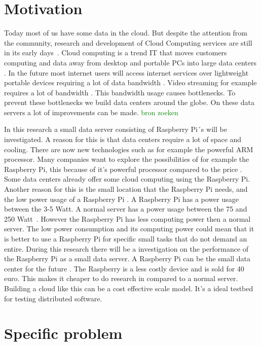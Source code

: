 \documentclass{sig-alternate-br}
\newcommand\todo[1]{
	\textcolor{green}{#1}
	}
\begin{document}
\section{Motivation}
Today most of us have some data in the cloud. But despite the attention from the community, research and development of Cloud Computing services are still in its early days~\cite{tso:2013}. \newline
Cloud computing is a trend IT that moves customers  computing and data away from desktop and portable PCs into large data centers \cite{dikaiakos:2009}. In the future most internet users will access internet services over lightweight portable devices requiring a lot of data bandwidth \cite{dikaiakos:2009}. Video streaming for example requires a lot of bandwidth \cite{Adhikari:2012}. This bandwidth usage causes bottlenecks. To prevent these bottlenecks we build data centers around the globe. On these data servers a lot of improvements can be made. \todo{bron zoeken}
 \newline
In this research a small data server consisting of Raspberry Pi´s will be investigated. A reason for this is that data centers require a lot of space and cooling. There are now new technologies such as for example the powerful ARM processor. Many companies want to explore the possibilities of for example the Raspberry Pi, this because of it's powerful processor compared to the price \cite{Pcextreme}. Some data centers already offer some cloud computing using the Raspberry Pi. Another reason for this is the small location that the Raspberry Pi needs, and the low power usage of a Raspberry Pi \cite{hosting,Pcextreme}. A Raspberry Pi has a power usage between the 3-5 Watt. A normal server has a power usage between the 75 and 250 Watt~\cite{Powerusage,beloglazov2012energy}. However the Raspberry Pi has less computing power then a normal server. The low power consumption and its computing power could mean that it is better to use a Raspberry Pi for specific small tasks that do not demand an entire. During this research there will be a investigation on the performance of the Raspberry Pi as a small data server. \newline
A Raspberry Pi can be the small data center for the future \cite{tso:2013}. The Raspberry is a less costly device and is sold for 40 euro. This makes it cheaper to do research in compared to a normal server.  Building a cloud like this can be a cost effective scale model\cite{tso:2013}. It's a ideal testbed for testing distributed software. 

\section{Specific problem}
\end{document}

